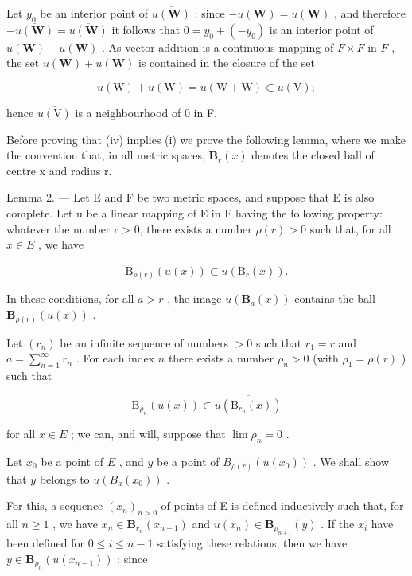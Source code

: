 Let \(y_0\) be an interior point of \(\overline{u(\mathbf{W})}\) ; since \(-u(\mathbf{W}) = u(\mathbf{W})\) , and therefore \(-\overline{u(\mathbf{W})} = \overline{u(\mathbf{W})}\) it follows that \(0 = y_0 + (-y_0)\) is an interior point of \(\overline{u(\mathbf{W})} + \overline{u(\mathbf{W})}\) . As vector addition is a continuous mapping of \(F \times F\) in \(F\) , the set \(\overline{u(\mathbf{W})} + \overline{u(\mathbf{W})}\) is contained in the closure of the set

\[
u (\mathrm{W}) + u (\mathrm{W}) = u (\mathrm{W} + \mathrm{W}) \subset u (\mathrm{V});
\]

hence \(\overline{u(\mathrm{V})}\) is a neighbourhood of 0 in F.

Before proving that (iv) implies (i) we prove the following lemma, where we make the convention that, in all metric spaces, \(\mathbf{B}_{r}(x)\) denotes the closed ball of centre x and radius r.

Lemma 2. --- Let E and F be two metric spaces, and suppose that E is also complete. Let u be a linear mapping of E in F having the following property: whatever the number r \textgreater{} 0, there exists a number \(\rho(r) > 0\) such that, for all \(x \in E\) , we have

\[
\mathrm{B} _ {\rho (r)} (u (x)) \subset \overline {{u (\mathrm{B} _ {r} (x))}}.
\]

In these conditions, for all \(a > r\) , the image \(u(\mathbf{B}_a(x))\) contains the ball \(\mathbf{B}_{\rho(r)}(u(x))\) .

Let \((r_n)\) be an infinite sequence of numbers \(>0\) such that \(r_1 = r\) and \(a = \sum_{n=1}^{\infty} r_n\) . For each index \(n\) there exists a number \(\rho_n > 0\) (with \(\rho_1 = \rho(r)\) ) such that

\[
\mathrm{B} _ {\rho_ {n}} (u (x)) \subset \overline {{u (\mathrm{B} _ {r _ {n}} (x))}}
\]

for all \(x \in E\) ; we can, and will, suppose that \(\lim \rho_{n} = 0\) .

Let \(x_0\) be a point of \(E\) , and \(y\) be a point of \(B_{\rho(r)}(u(x_0))\) . We shall show that \(y\) belongs to \(u(B_a(x_0))\) .

For this, a sequence \((x_{n})_{n>0}\) of points of E is defined inductively such that, for all \(n \geqslant 1\) , we have \(x_{n} \in \mathbf{B}_{r_{n}}(x_{n-1})\) and \(u(x_{n}) \in \mathbf{B}_{\rho_{n+1}}(y)\) . If the \(x_{i}\) have been defined for \(0 \leqslant i \leqslant n - 1\) satisfying these relations, then we have \(y \in \mathbf{B}_{\rho_{n}}(u(x_{n-1}))\) ; since


